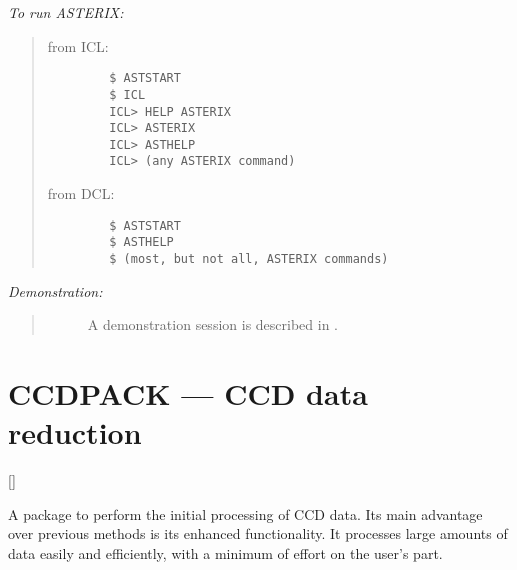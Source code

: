 {\em To run ASTERIX:}\hfill
\begin{quote}
\begin{description}

\item [from ICL:]\hfill

\begin{small}
\begin{verbatim}
   $ ASTSTART
   $ ICL
   ICL> HELP ASTERIX
   ICL> ASTERIX
   ICL> ASTHELP
   ICL> (any ASTERIX command)
\end{verbatim}
\end{small}


\item [from DCL:]\hfill

\begin{small}
\begin{verbatim}
   $ ASTSTART
   $ ASTHELP
   $ (most, but not all, ASTERIX commands)
\end{verbatim}
\end{small}

\end{description}
\end{quote}

{\em Demonstration:}\hfill
\begin{quote}
\begin{description}
\item [] A demonstration session is described in
.
\end{description}
\end{quote}

\newpage

\section{CCDPACK --- CCD data reduction} 

\vspace{-11mm}

\hfill []

\vspace{5mm}

A package to perform the initial processing of CCD data.
Its main advantage over previous methods is its enhanced functionality.
It processes large amounts of data easily and efficiently, with a minimum of
effort on the user's part.

